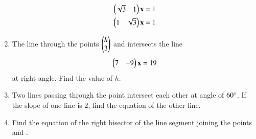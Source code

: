 \begin{enumerate}[label=\arabic*.,ref=\thesubsection.\theenumi]
\begin{align}
\begin{pmatrix}\sqrt{3} & 1\end{pmatrix}\mathbf{x} &= 1
\\
\begin{pmatrix}1 & \sqrt{3}\end{pmatrix}\mathbf{x} &= 1
\end{align}
\item The line through the points $\begin{pmatrix}h\\3\end{pmatrix}$ and  intersects the line 
\begin{align}
\begin{pmatrix}7 & -9\end{pmatrix}\mathbf{x} = 19
\end{align}
at right angle.  Find the value of $h$.
\item Two lines passing through the point  intersect each other at angle of $60\degree$.  If the slope of one line is 2, find the equation of the other line.
\item Find the equation of the right bisector of the line segment joining the points  and .


\end{enumerate}
